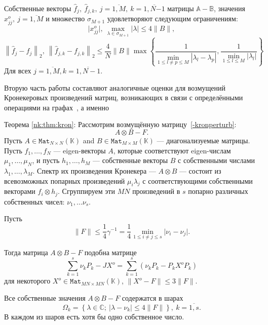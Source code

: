 Собственные векторы
    \( \hat{f}_j,\ \hat{f}_{j,k},\ j{=}\overline{1,M},\ k{=}\overline{1,N{-1}} \)
    матрицы \( \mathbb{A}{-}\mathbb{B} \),
    значения \( x_{jj}^o,\ j{=}\overline{1,M} \)
    и множество \( \sigma_{M{+}1} \) удовлетворяют следующим ограничениям:
\[
    \lvert x_{jj}^o\rvert,
    \ \max_{\lambda\in\sigma_{M{+}1}} \lvert\lambda\rvert
    \leq 4\|B\|,
\]
\[
    \left\| \hat{f}_j - f_j \right\|_2,
    \ \left\| \hat{f}_{j,k} - f_{j,k}\right\|_2
    \leq
    \frac4N \|B\|
         \max\left\{
         \frac{1}{
             \min\limits_{1\leq l{\neq}p \leq M }{|\lambda_l - \lambda_p|}},
         \frac{1}{
             \min\limits_{1\leq l \leq M}{|\lambda_l|}}
         \right\}
\]
Для всех \( j{=}\overline{1,M}, k{=}\overline{1,N-1} \).
    
Вторую часть работы составляют аналогичные оценки для возмущений Кронекеровых
произведений матриц, возникающих в связи с определёнными операциями на
графах~\cite{bellman-matrices-kron,XIANG2005210}, а именно

Теорема \ref{nk:thm:kron}:
    Рассмотрим возмущённую матрицу~\eqref{-kronperturb}:
        \[
            A{\otimes}B - F.
        \]
    Пусть \( A\in\mathtt{Mat}_{N{\times}N}(\mathbb{K}) \) and \( B\in\mathtt{Mat}_{M{\times}M}(\mathbb{K}) \)
    --- диагонализуемые матрицы.
    Пусть \( f_1, \ldots, f_N \) --- eigen-векторы \( A \),
        которые соответствуют eigen-числам \( \mu_1, \ldots, \mu_N \),
        и пусть \( h_1, \ldots, h_M \) --- собственные векторы \( B \)
        с собственными числами \( \lambda_1, \ldots, \lambda_M \).
    Спектр их произведения Кронекера --- \( A{\otimes}B \) ---
        состоит из всевозможных попарных произведений \( \mu_i \lambda_j \)
        с соответствующими собственными векторами \( f_i\otimes h_j \).
    Сгруппируем эти \( MN \) произведений в \( s \) попарно различных
    собственных чисел:
        \( \nu_1, \ldots \nu_s \).

    Пусть
    \[
        \|F\| \leq \frac14 \gamma^{-1} = \frac14 \min_{1\leq i{\neq}j\leq s}\lvert\nu_i - \nu_j\rvert.
    \]

    Тогда матрица \( A{\otimes}B - F \) подобна матрице
    \[ \sum_{k=1}^s \nu_k P_k - JX^o = \sum_{k=1}^s (\nu_k P_k - P_k X^o P_k) \]
    для некоторого \( X^o \in \mathtt{Mat}_{MN{\times}MN}(\mathbb{K}) \),
    \( \|X^o - F\|\leq 3\|F\| \).

    Все собственные значения \( A{\otimes}B - F \) содержатся в шарах
    \[
        \Omega_k = \left\{
            \lambda\in\mathbb{C};
            \ \lvert\lambda - \nu_k\rvert \leq 4\|F\|
            \right\},
        \ k{=}\overline{1,s}.
    \]
    В каждом из шаров есть хотя бы одно собственное число.

